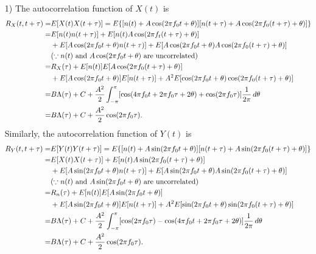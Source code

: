 \documentclass{assignment}
\begin{document}
\begin{sol}
    \begin{itemize}
        \item[1)] The autocorrelation function of $X(t)$ is
        \begin{align}
            \notag R_X(t,t+\tau)=&E[X(t)X(t+\tau)]=E\{[n(t)+A\cos(2\pi f_0t+\theta)][n(t+\tau)+A\cos(2\pi f_0(t+\tau)+\theta)]\}\\
            \notag=&E[n(t)n(t+\tau)]+E[n(t)A\cos(2\pi f_t(t+\tau)+\theta)]\\
            \notag&+E[A\cos(2\pi f_0t+\theta)n(t+\tau)]+E[A\cos(2\pi f_0t+\theta)A\cos(2\pi f_0(t+\tau)+\theta)]\\
            \notag&(\because n(t)\text{ and }A\cos(2\pi f_0t+\theta)\text{ are uncorrelated})\\
            \notag=&R_X(\tau)+E[n(t)]E[A\cos(2\pi f_0(t+\tau)+\theta)]\\
            \notag&+E[A\cos(2\pi f_0t+\theta)]E[n(t+\tau)]+A^2E[\cos(2\pi f_0t+\theta)\cos(2\pi f_0(t+\tau)+\theta)]\\
            \notag=&B\Lambda(\tau)+C+\frac{A^2}{2}\int_{-\pi}^{\pi}[\cos(4\pi f_0t+2\pi f_0\tau+2\theta)+\cos(2\pi f_0\tau)]\frac{1}{2\pi}\,d\theta\\
            =&B\Lambda(\tau)+C+\frac{A^2}{2}\cos(2\pi f_0\tau).
        \end{align}
        Similarly, the autocorrelation function of $Y(t)$ is
        \begin{align}
            \notag R_Y(t,t+\tau)=&E[Y(t)Y(t+\tau)]=E\{[n(t)+A\sin(2\pi f_0t+\theta)][n(t+\tau)+A\sin(2\pi f_0(t+\tau)+\theta)]\}\\
            \notag=&E[X(t)X(t+\tau)]+E[n(t)A\sin(2\pi f_0(t+\tau)+\theta)]\\
            \notag&+E[A\sin(2\pi f_0t+\theta)n(t+\tau)]+E[A\sin(2\pi f_0t+\theta)A\sin(2\pi f_0(t+\tau)+\theta)]\\
            \notag&(\because n(t)\text{ and }A\sin(2\pi f_0t+\theta)\text{ are uncorrelated})\\
            \notag=&R_n(\tau)+E[n(t)]E[A\sin(2\pi f_0t+\theta)]\\
            \notag&+E[A\sin(2\pi f_0t+\theta)]E[n(t+\tau)]+A^2E[\sin(2\pi f_0t+\theta)\sin(2\pi f_0(t+\tau)+\theta)]\\
            \notag=&B\Lambda(\tau)+C+\frac{A^2}{2}\int_{-\pi}^{\pi}[\cos(2\pi f_0\tau)-\cos(4\pi f_0t+2\pi f_0\tau+2\theta)]\frac{1}{2\pi}\,d\theta\\
            =&B\Lambda(\tau)+C+\frac{A^2}{2}\cos(2\pi f_0\tau).

\end{align}
\end{itemize}
\end{sol}
\end{document}
